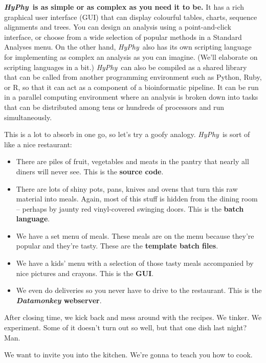 \documentclass[12pt]{book}
\newcommand{\hyphy}{\textit{HyPhy}}
\begin{document}
\textbf{\hyphy\ is as simple or as complex as you need it to be.}  It has a rich graphical user interface (GUI) that can display colourful tables, charts, sequence alignments and trees.  You can design an analysis using a point-and-click interface, or choose from a wide selection of popular methods in a Standard Analyses menu.  On the other hand, \hyphy\ also has its own scripting language for implementing as complex an analysis as you can imagine.  (We'll elaborate on scripting languages in a bit.)  \hyphy\ can also be compiled as a shared library that can be called from another programming environment such as Python, Ruby, or R, so that it can act as a component of a bioinformatic pipeline.  It can be run in a parallel computing environment where an analysis is broken down into tasks that can be distributed among tens or hundreds of processors and run simultaneously.  

This is a lot to absorb in one go, so let's try a goofy analogy.  \hyphy\ is sort of like a nice restaurant:
\begin{itemize}
\itemsep 0pt
\item There are piles of fruit, vegetables and meats in the pantry that nearly all diners will never see.  This is the {\bf source code}.  
\item There are lots of shiny pots, pans, knives and ovens that turn this raw material into meals.  Again, most of this stuff is hidden from the dining room -- perhaps by jaunty red vinyl-covered swinging doors.  This is the {\bf batch language}.
\item We have a set menu of meals.  These meals are on the menu because they're popular and they're tasty.  These are the {\bf template batch files}.  
\item We have a kids' menu with a selection of those tasty meals accompanied by nice pictures and crayons.  This is the {\bf GUI}.
\item We even do deliveries so you never have to drive to the restaurant.  This is the \textbf{\textit{Datamonkey} webserver}.
\end{itemize}

\noindent After closing time, we kick back and mess around with the recipes.  We tinker.  We experiment.  Some of it doesn't turn out so well, but that one dish last night?  Man.  

\vspace{1em}
We want to invite you into the kitchen.  We're gonna to teach you how to cook.


\end{document}
